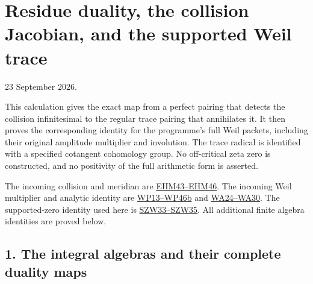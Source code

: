 \documentclass[
  10pt,
  a4paper,
]{article}
\author{}
\date{}
\begin{document}
{
\setcounter{tocdepth}{3}
\tableofcontents
}
\section{Residue duality, the collision Jacobian, and the supported Weil
trace}\label{residue-duality-the-collision-jacobian-and-the-supported-weil-trace}

23 September 2026.

This calculation gives the exact map from a perfect pairing that detects
the collision infinitesimal to the regular trace pairing that
annihilates it. It then proves the corresponding identity for the
programme's full Weil packets, including their original amplitude
multiplier and involution. The trace radical is identified with a
specified cotangent cohomology group. No off-critical zeta zero is
constructed, and no positivity of the full arithmetic form is asserted.

The incoming collision and meridian are
\href{https://github.com/KokunoYumeto/zeta-function-research-reader/blob/4a4238afc992e77aee83b97d38a1a63d283f540c/workbenches/splitzero-tandem/branches/tau-zero-prime-positivity/EIGHT_STATE_HOLONOMY_DERIVATION.md}{EHM43--EHM46}.
The incoming Weil multiplier and analytic identity are
\href{https://github.com/KokunoYumeto/zeta-function-research-reader/blob/4a4238afc992e77aee83b97d38a1a63d283f540c/workbenches/splitzero-tandem/branches/tau-zero-prime-positivity/WEIL_PACKET_DERIVATION.md}{WP13--WP46b}
and
\href{https://github.com/KokunoYumeto/zeta-function-research-reader/blob/4a4238afc992e77aee83b97d38a1a63d283f540c/workbenches/splitzero-tandem/branches/tau-zero-prime-positivity/WEIL_PACKET_ANALYTIC_DERIVATION.md}{WA24--WA30}.
The supported-zero identity used here is
\href{https://github.com/KokunoYumeto/zeta-function-research-reader/blob/4a4238afc992e77aee83b97d38a1a63d283f540c/workbenches/splitzero-tandem/branches/tau-zero-prime-positivity/SUPPORTED_ZERO_PRIME_WEIL_DERIVATION.md}{SZW33--SZW35}.
All additional finite algebra identities are proved below.

\subsection{1. The integral algebras and their complete duality
maps}\label{the-integral-algebras-and-their-complete-duality-maps}
\end{document}
